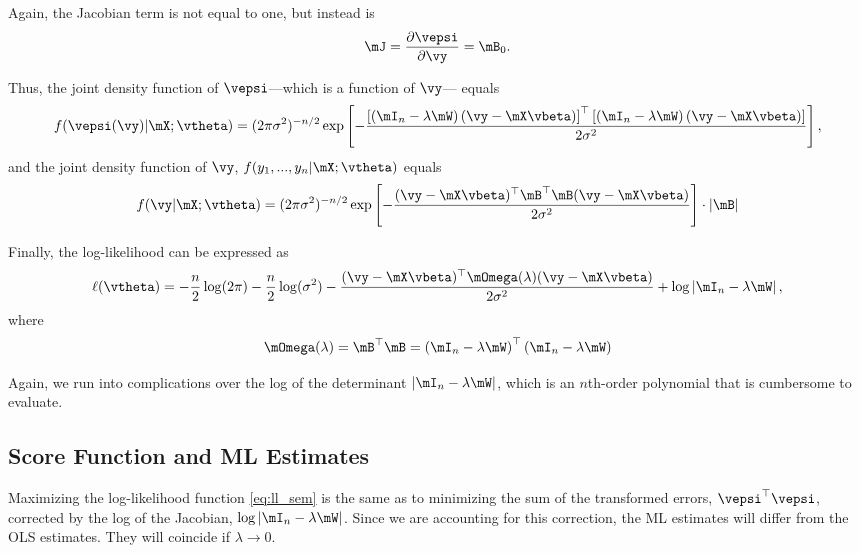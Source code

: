 \documentclass[english,12pt]{book}\usepackage[]{graphicx}\usepackage[]{xcolor}
\begin{document}
Again, the Jacobian term is not equal to one, but instead is
\begin{equation*}
\mJ = \frac{\partial \vepsi}{\partial \vy} =\mB_0.
\end{equation*}

Thus, the joint density function of $\vepsi$---which is a function of $\vy$--- equals
\begin{equation*}
  f(\vepsi(\vy)| \mX ; \vtheta) = (2\pi \sigma^2)^{-n/2}\exp\left[- \frac{\left[\left(\mI_n-\lambda\mW\right)(\vy - \mX\vbeta)\right]^\top \left[\left(\mI_n-\lambda\mW\right)(\vy - \mX\vbeta)\right]}{2\sigma^2}\right],
\end{equation*}
%
and the joint density function of $\vy$, $f(y_1,...,y_n|\mX; \vtheta)$ equals
\begin{equation*}
  f(\vy| \mX ; \vtheta) = (2\pi \sigma^2)^{-n/2}\exp\left[- \frac{(\vy - \mX\vbeta)^\top \mB^\top \mB (\vy - \mX\vbeta)}{2\sigma^2}\right]\cdot \left|\mB\right|
\end{equation*}

Finally, the log-likelihood can be expressed as
\begin{equation}\label{eq:ll_sem}
\ell(\vtheta) = - \frac{n}{2}\log(2\pi) - \frac{n}{2}\log(\sigma^2)-\frac{(\vy - \mX\vbeta)^\top \mOmega(\lambda) (\vy - \mX\vbeta)}{2\sigma^2} + \log\left|\mI_n - \lambda \mW\right|,
\end{equation}
%
where 
\begin{equation*}
\mOmega(\lambda) = \mB^\top \mB = \left(\mI_n-\lambda\mW\right)^\top \left(\mI_n-\lambda\mW\right)
\end{equation*}

Again, we run into complications over the log of the determinant $\left|\mI_n - \lambda \mW\right|$, which is an $n$th-order polynomial that is cumbersome to evaluate. 

\subsection{Score Function and ML Estimates}\label{sec:sem_ml_estimates}

Maximizing the log-likelihood function \eqref{eq:ll_sem} is the same as to minimizing the sum of the transformed errors, $\vepsi^\top\vepsi$, corrected by the log of the Jacobian, $\log\left|\mI_n - \lambda \mW\right|$. Since we are accounting for this correction, the ML estimates will differ from the OLS estimates. They will coincide if $\lambda \to 0$. 
\end{document}
